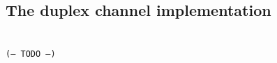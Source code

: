 \documentclass[12pt,journal,compsoc]{IEEEtran}
\newcommand{\code}[1]{\texttt{#1}}
\begin{document}
\subsection{The duplex channel implementation}
\\\code{(-- TODO --)}
%
%



%
%
\end{document}
